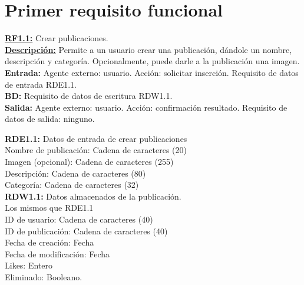 \section{Primer requisito funcional}
\textbf{\textcolor{rojo}{\underline{RF1.1:}}} Crear publicaciones. \\[6pt]

\textbf{\textcolor{rojo}{\underline{Descripción:}}} Permite a un usuario crear una publicación, 
dándole un nombre, descripción y categoría. Opcionalmente, puede darle a la publicación una imagen. \\[6pt]

\textbf{\textcolor{rojo}{Entrada:}} Agente externo: usuario. Acción: solicitar inserción. 
Requisito de datos de entrada \textcolor{azul}{RDE1.1}. \\[6pt]

\textbf{\textcolor{rojo}{BD:}} Requisito de datos de escritura \textcolor{azul}{RDW1.1}. \\[6pt]

\textbf{\textcolor{rojo}{Salida:}} Agente externo: usuario. Acción: confirmación resultado. 
Requisito de datos de salida: ninguno. \\[12pt]
\pagebreak

\textcolor{azul}{\textbf{RDE1.1:}} Datos de entrada de crear publicaciones \\
\hspace*{1cm} Nombre de publicación: Cadena de caracteres (20) \\
\hspace*{1cm} Imagen (opcional): Cadena de caracteres (255) \\
\hspace*{1cm} Descripción: Cadena de caracteres (80) \\ 
\hspace*{1cm} Categoría: Cadena de caracteres (32) \\[12pt]

\textcolor{azul}{\textbf{RDW1.1:}} Datos almacenados de la publicación. \\
\hspace*{1cm} Los mismos que RDE1.1 \\
\hspace*{1cm} ID de usuario: Cadena de caracteres (40) \\
\hspace*{1cm} ID de publicación: Cadena de caracteres (40) \\
\hspace*{1cm} Fecha de creación: Fecha \\
\hspace*{1cm} Fecha de modificación: Fecha \\
\hspace*{1cm} Likes: Entero \\ 
\hspace*{1cm} Eliminado: Booleano. \\[12pt]

